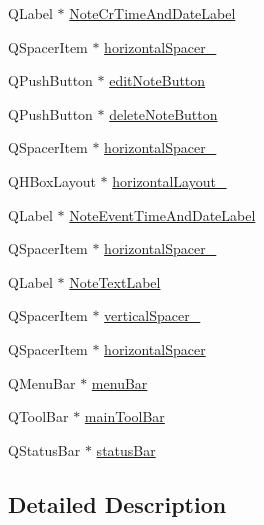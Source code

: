 \begin{DoxyCompactItemize}
\item 
Q\+Label $\ast$ \hyperlink{classUi__MattyNotesClass_a809a1da050008644a0b8e986348d952d}{Note\+Cr\+Time\+And\+Date\+Label}
\item 
Q\+Spacer\+Item $\ast$ \hyperlink{classUi__MattyNotesClass_ae061dfb9d8a6a4af88b1d97c4c9a50e6}{horizontal\+Spacer\+\_}
\item 
Q\+Push\+Button $\ast$ \hyperlink{classUi__MattyNotesClass_ab58c2780261a9be6d5ee1baae1743c4a}{edit\+Note\+Button}
\item 
Q\+Push\+Button $\ast$ \hyperlink{classUi__MattyNotesClass_ad921ff558d332e85a8b8ca56953ced43}{delete\+Note\+Button}
\item 
Q\+Spacer\+Item $\ast$ \hyperlink{classUi__MattyNotesClass_a5d039495d4d89675b39f564a77484c6e}{horizontal\+Spacer\+\_}
\item 
Q\+H\+Box\+Layout $\ast$ \hyperlink{classUi__MattyNotesClass_a6681d3ce8f04c81a339e747865079634}{horizontal\+Layout\+\_}
\item 
Q\+Label $\ast$ \hyperlink{classUi__MattyNotesClass_a6d8a5e072fade547f2bdd1ab5b1fa698}{Note\+Event\+Time\+And\+Date\+Label}
\item 
Q\+Spacer\+Item $\ast$ \hyperlink{classUi__MattyNotesClass_a715fcf11e482f09362cd1403a60ad8cb}{horizontal\+Spacer\+\_}
\item 
Q\+Label $\ast$ \hyperlink{classUi__MattyNotesClass_abcdc470e53acc292fcc388f84db2ac39}{Note\+Text\+Label}
\item 
Q\+Spacer\+Item $\ast$ \hyperlink{classUi__MattyNotesClass_a51e58a329011bb7ae0564f78fb22ad97}{vertical\+Spacer\+\_}
\item 
Q\+Spacer\+Item $\ast$ \hyperlink{classUi__MattyNotesClass_ac4b0de0a29ecefe9ab9355af44d9996a}{horizontal\+Spacer}
\item 
Q\+Menu\+Bar $\ast$ \hyperlink{classUi__MattyNotesClass_ac32889547eae8466a915c6aac099df4a}{menu\+Bar}
\item 
Q\+Tool\+Bar $\ast$ \hyperlink{classUi__MattyNotesClass_a4ff9c72ed35ac4d0873ea7398281e0fe}{main\+Tool\+Bar}
\item 
Q\+Status\+Bar $\ast$ \hyperlink{classUi__MattyNotesClass_a00010e0401915a0f78491262b87b807d}{status\+Bar}
\end{DoxyCompactItemize}


\subsection{Detailed Description}


